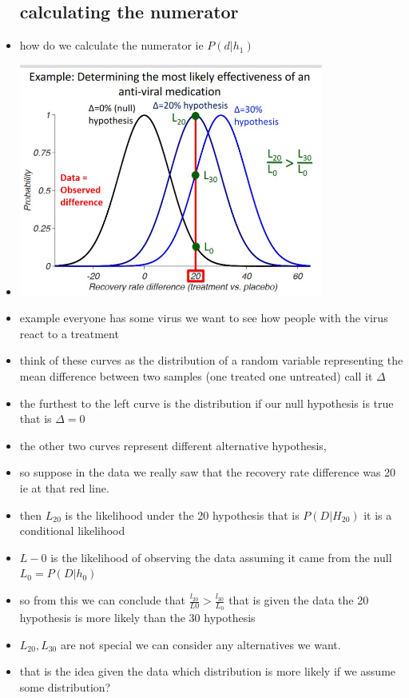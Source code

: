 \documentclass{article}
\begin{document}
\begin{itemize}
\subsection{calculating the numerator}
\item how do we calculate the numerator ie $P(d|h_1)$
\item  \includegraphics[width=10cm]{Final_Review/lecture_6/virus example.jpg}
\item example everyone has some virus we want to see how people with the virus react to a treatment
\item think of these curves as the distribution of a random variable representing the mean difference between two samples (one treated one untreated) call it $\Delta$
\item the furthest to the left curve is the distribution if our null hypothesis is true that is $\Delta=0$ 
\item the other two curves represent different alternative hypothesis, 
\item so suppose in the data we really saw that the recovery rate difference was 20 ie at that red line. 
\item then $L_20$ is the likelihood under the 20 hypothesis that is $P(D|H_{20})$ it is a conditional likelihood
\item $L-0$ is the likelihood of observing the data assuming it came from the null $L_0=P(D|h_{0})$
\item so from this we can conclude that $\frac{l_{20}}{L{0}}>\frac{l_{30}}{L_{0}}$ that is given the data the 20 hypothesis is more likely than the 30 hypothesis 
\item $L_20, L_30$ are not special we can consider any alternatives we want. 
\item that is the idea given the data which distribution is more likely if we assume some distribution? 

\end{itemize}
\end{document}
